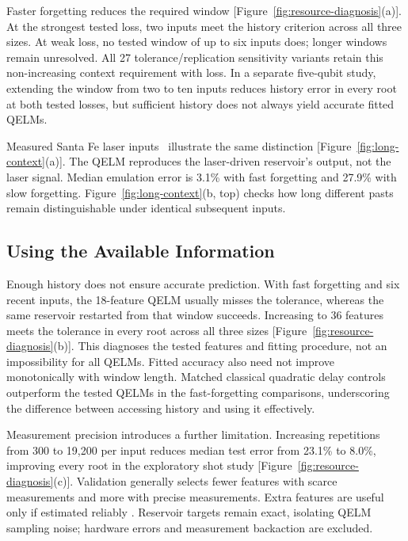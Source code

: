 Faster forgetting reduces the required window [Figure~\ref{fig:resource-diagnosis}(a)].
At the strongest tested loss, two inputs meet the history criterion across
all three sizes. At weak loss, no tested window of up to six inputs does;
longer windows remain unresolved. All 27 tolerance/replication sensitivity
variants retain this non-increasing context requirement with loss.
In a separate five-qubit study, extending the window from two to ten inputs
reduces history error in every root at both tested losses, but sufficient
history does not always yield accurate fitted QELMs.

Measured Santa Fe laser inputs~\cite{weigend1993timeseries} illustrate the
same distinction [Figure~\ref{fig:long-context}(a)]. The QELM reproduces the
laser-driven reservoir's output, not the laser signal. Median emulation
error is 3.1\% with fast forgetting and 27.9\% with slow forgetting.
Figure~\ref{fig:long-context}(b, top) checks how long different pasts remain
distinguishable under identical subsequent inputs.

\subsection{Using the Available Information}

Enough history does not ensure accurate prediction. With fast forgetting
and six recent inputs, the 18-feature QELM usually misses the tolerance,
whereas the same reservoir restarted from that window succeeds. Increasing
to 36 features meets the tolerance in every root across all three sizes
[Figure~\ref{fig:resource-diagnosis}(b)]. This diagnoses the tested features
and fitting procedure, not an impossibility for all QELMs. Fitted accuracy
also need not improve monotonically with window length. Matched classical
quadratic delay controls outperform the tested QELMs in the fast-forgetting
comparisons, underscoring the difference between accessing history and
using it effectively.

Measurement precision introduces a further limitation. Increasing
repetitions from 300 to 19,200 per input reduces median test error from
23.1\% to 8.0\%, improving every root in the exploratory shot study
[Figure~\ref{fig:resource-diagnosis}(c)]. Validation generally selects fewer
features with scarce measurements and more with precise measurements.
Extra features are useful only if estimated reliably
\cite{hu2023sampling,ahmed2025finite}. Reservoir targets remain exact,
isolating QELM sampling noise; hardware errors and measurement backaction
are excluded.

